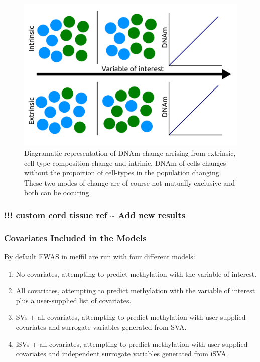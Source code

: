 \documentclass[
]{book}
\providecommand{\tightlist}{%
  \setlength{\itemsep}{0pt}\setlength{\parskip}{0pt}}
\begin{document}
\begin{figure}

{\centering \includegraphics[width=0.8\linewidth]{figs/IntrinsicVsExtrinsicDNAmChangeGeneral} 

}

\caption{Diagramatic representation of DNAm change arrising from extrinsic, cell-type composition change and intrinic, DNAm of cells changes without the proportion of cell-types in the population changing. These two modes of change are of course not mutually exclusive and both can be occuring.}\label{fig:IntrinsicVsExtrinsicDNAmChangeGeneral}
\end{figure}



\hypertarget{custom-cord-tissue-ref-add-new-results}{%
\subsubsection{!!! custom cord tissue ref \textasciitilde{} Add new results}\label{custom-cord-tissue-ref-add-new-results}}

\hypertarget{covariates-included-in-the-models}{%
\subsubsection{Covariates Included in the Models}\label{covariates-included-in-the-models}}

By default EWAS in meffil are run with four different models:

\begin{enumerate}
\def\labelenumi{\arabic{enumi}.}
\tightlist
\item
  No covariates, attempting to predict methylation with the variable of interest.
\item
  All covariates, attempting to predict methylation with the variable of interest plus a user-supplied list of covariates.
\item
  SVs + all covariates, attempting to predict methylation with user-supplied covariates and surrogate variables generated from SVA.
\item
  iSVs + all covariates, attempting to predict methylation with user-supplied covariates and independent surrogate variables generated from iSVA.
\end{enumerate}
\end{document}

